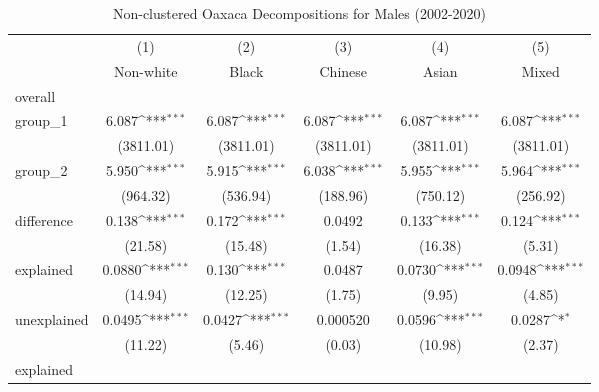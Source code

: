 \begin{table}[htbp]\centering
\def\sym#1{\ifmmode^{#1}\else\(^{#1}\)\fi}
\caption{Non-clustered Oaxaca Decompositions for Males (2002-2020)\label{tab1}}
\begin{tabular}{l*{5}{c}}
\hline\hline
            &\multicolumn{1}{c}{(1)}&\multicolumn{1}{c}{(2)}&\multicolumn{1}{c}{(3)}&\multicolumn{1}{c}{(4)}&\multicolumn{1}{c}{(5)}\\
            &\multicolumn{1}{c}{Non-white}&\multicolumn{1}{c}{Black}&\multicolumn{1}{c}{Chinese}&\multicolumn{1}{c}{Asian}&\multicolumn{1}{c}{Mixed}\\
\hline
overall     &                     &                     &                     &                     &                     \\
group\_1     &       6.087\sym{***}&       6.087\sym{***}&       6.087\sym{***}&       6.087\sym{***}&       6.087\sym{***}\\
            &   (3811.01)         &   (3811.01)         &   (3811.01)         &   (3811.01)         &   (3811.01)         \\
group\_2     &       5.950\sym{***}&       5.915\sym{***}&       6.038\sym{***}&       5.955\sym{***}&       5.964\sym{***}\\
            &    (964.32)         &    (536.94)         &    (188.96)         &    (750.12)         &    (256.92)         \\
difference  &       0.138\sym{***}&       0.172\sym{***}&      0.0492         &       0.133\sym{***}&       0.124\sym{***}\\
            &     (21.58)         &     (15.48)         &      (1.54)         &     (16.38)         &      (5.31)         \\
explained   &      0.0880\sym{***}&       0.130\sym{***}&      0.0487         &      0.0730\sym{***}&      0.0948\sym{***}\\
            &     (14.94)         &     (12.25)         &      (1.75)         &      (9.95)         &      (4.85)         \\
unexplained &      0.0495\sym{***}&      0.0427\sym{***}&    0.000520         &      0.0596\sym{***}&      0.0287\sym{*}  \\
            &     (11.22)         &      (5.46)         &      (0.03)         &     (10.98)         &      (2.37)         \\
\hline
explained   &                     &                     &                     &                     &                     \\

\end{tabular}
\end{table}
